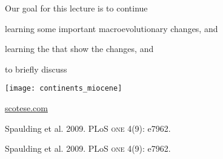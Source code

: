 \documentclass[t]{beamer}
\begin{document}

\begin{frame}{Our goal for this lecture is to continue}
	
	\hangpara learning some important macroevolutionary changes, and
	
	\hangpara learning the  that show the changes, and
	
	\hangpara to briefly discuss 

\end{frame}
%
{
\begin{frame}[t]
	\texttt{[image: continents\_miocene]}
	
	\vfilll
	
	\hfill \tiny \textcolor{white}{\href{http://scotese.com}{scotese.com}}
\end{frame}
}
%


{
\begin{frame}[b]

\tiny Spaulding et al. 2009. PLoS \textsc{one} 4(9): e7962.
\end{frame}
}

{
\begin{frame}[b]

\tiny Spaulding et al. 2009. PLoS \textsc{one} 4(9): e7962.
\end{frame}
}
\end{document}
